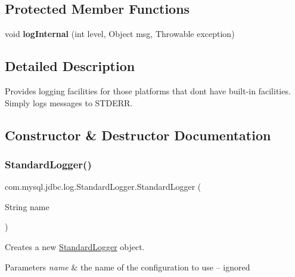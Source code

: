 \subsection*{Protected Member Functions}
\begin{DoxyCompactItemize}
\item 
\mbox{\label{classcom_1_1mysql_1_1jdbc_1_1log_1_1_standard_logger_ab18d00ac969f7f9c648093eaac4b91f3}} 
void {\bfseries log\+Internal} (int level, Object msg, Throwable exception)
\end{DoxyCompactItemize}


\subsection{Detailed Description}
Provides logging facilities for those platforms that don\textquotesingle{}t have built-\/in facilities. Simply logs messages to S\+T\+D\+E\+RR. 

\subsection{Constructor \& Destructor Documentation}
\mbox{\label{classcom_1_1mysql_1_1jdbc_1_1log_1_1_standard_logger_ae1a2e1589d15daae2277ba71a4fd38fd}} 
\subsubsection{\texorpdfstring{Standard\+Logger()}{StandardLogger()}\hspace{0.1cm}{\footnotesize\ttfamily [1/2]}}
{\footnotesize\ttfamily com.\+mysql.\+jdbc.\+log.\+Standard\+Logger.\+Standard\+Logger (\begin{DoxyParamCaption}\item[{String}]{name }\end{DoxyParamCaption})}

Creates a new \mbox{\hyperlink{classcom_1_1mysql_1_1jdbc_1_1log_1_1_standard_logger}{Standard\+Logger}} object.


\begin{DoxyParams}{Parameters}
{\em name} & the name of the configuration to use -- ignored \\
\hline
\end{DoxyParams}
\mbox{\label{classcom_1_1mysql_1_1jdbc_1_1log_1_1_standard_logger_a76e2fb89ecf3c10a85509f908c875442}} 
